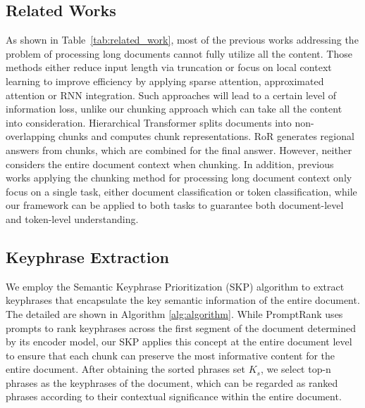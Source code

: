 \documentclass[11pt]{article}
\begin{document}
\subsection{Related Works}
\label{app:related_works}

As shown in Table~\ref{tab:related_work}, most of the previous works addressing the problem of processing long documents cannot fully utilize all the content. Those methods either reduce input length via truncation or focus on local context learning to improve efficiency by applying sparse attention, approximated attention or RNN integration. Such approaches will lead to a certain level of information loss, unlike our chunking approach which can take all the content into consideration.
Hierarchical Transformer \citep{pappagari2019hierarchical} splits documents into non-overlapping chunks and computes chunk representations. RoR \citep{zhao2021ror} generates regional answers from chunks, which are combined for the final answer. However, neither considers the entire document context when chunking.
In addition, previous works applying the chunking method for processing long document context only focus on a single task, either document classification or token classification, while our framework can be applied to both tasks to guarantee both document-level and token-level understanding.

\subsection{Keyphrase Extraction}
\label{app:algorithm}
We employ the Semantic Keyphrase Prioritization (SKP) algorithm to extract keyphrases that encapsulate the key semantic information of the entire document. The detailed are shown in Algorithm \ref{alg:algorithm}.
While PromptRank uses prompts to rank keyphrases across the first segment of the document determined by its encoder model, our SKP applies this concept at the entire document level to ensure that each chunk can preserve the most informative content for the entire document. After obtaining the sorted phrases set $K_s$, we select top-n phrases as the keyphrases of the document, which can be regarded as ranked phrases according to their contextual significance within the entire document.
\end{document}
